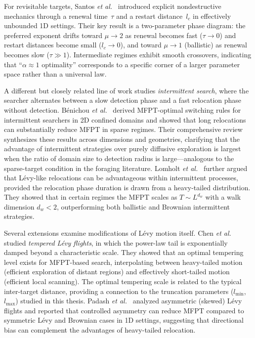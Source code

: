 For revisitable targets, Santos \emph{et al.}~\cite{santos2004optimal} introduced explicit nondestructive mechanics through a renewal time~$\tau$ and a restart distance~$l_c$ in effectively unbounded 1D settings. Their key result is a two-parameter phase diagram: the preferred exponent drifts toward $\mu \to 2$ as renewal becomes fast ($\tau \to 0$) and restart distances become small ($l_c \to 0$), and toward $\mu \to 1$ (ballistic) as renewal becomes slow ($\tau \gg 1$). Intermediate regimes exhibit smooth crossovers, indicating that ``$\alpha \approx 1$ optimality'' corresponds to a specific corner of a larger parameter space rather than a universal law.

A different but closely related line of work studies \emph{intermittent search}, where the searcher alternates between a slow detection phase and a fast relocation phase without detection. B{\'e}nichou \emph{et al.}~\cite{benichou2006twodimensional} derived MFPT-optimal switching rules for intermittent searchers in 2D confined domains and showed that long relocations can substantially reduce MFPT in sparse regimes. Their comprehensive review~\cite{benichou2011intermittent} synthesizes these results across dimensions and geometries, clarifying that the advantage of intermittent strategies over purely diffusive exploration is largest when the ratio of domain size to detection radius is large---analogous to the sparse-target condition in the foraging literature. Lomholt \emph{et al.}~\cite{lomholt2008levy} further argued that L\'evy-like relocations can be advantageous within intermittent processes, provided the relocation phase duration is drawn from a heavy-tailed distribution. They showed that in certain regimes the MFPT scales as $T \sim L^{d_w}$ with a walk dimension $d_w < 2$, outperforming both ballistic and Brownian intermittent strategies.

Several extensions examine modifications of L\'evy motion itself. Chen \emph{et al.}~\cite{chen2018tempered} studied \emph{tempered L\'evy flights}, in which the power-law tail is exponentially damped beyond a characteristic scale. They showed that an optimal tempering level exists for MFPT-based search, interpolating between heavy-tailed motion (efficient exploration of distant regions) and effectively short-tailed motion (efficient local scanning). The optimal tempering scale is related to the typical inter-target distance, providing a connection to the truncation parameters ($l_{\min}$, $l_{\max}$) studied in this thesis. Padash \emph{et al.}~\cite{padash2022asymmetric} analyzed asymmetric (skewed) L\'evy flights and reported that controlled asymmetry can reduce MFPT compared to symmetric L\'evy and Brownian cases in 1D settings, suggesting that directional bias can complement the advantages of heavy-tailed relocation.

